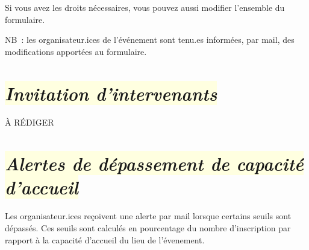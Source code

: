 \documentclass[10pt,a4paper]{article}
\newcommand{\jaunepale}[1]{\colorbox{LightYellow}{#1}}
\begin{document}
Si vous avez les droits nécessaires, vous pouvez aussi modifier l'ensemble du formulaire.

NB : les organisateur.ices de l'événement sont tenu.es informées, par mail, des modifications apportées au formulaire.

\section*{\jaunepale{\emph{Invitation d'intervenants}}}

À RÉDIGER

\section*{\jaunepale{\emph{Alertes de dépassement de capacité d'accueil}}}

Les organisateur.ices reçoivent une alerte par mail lorsque certains seuils sont dépassés. Ces seuils sont calculés en pourcentage du nombre d'inscription par rapport à la capacité d'accueil du lieu de l'évenement.




\vspace{1cm}
\hfill

\end{document}
